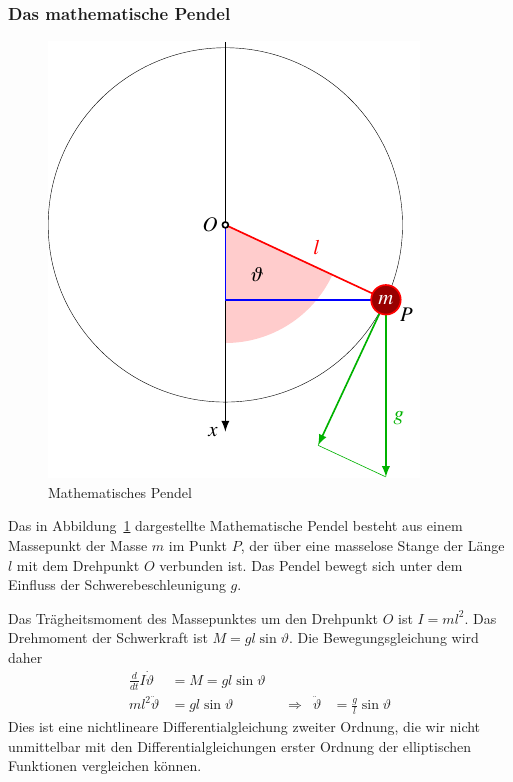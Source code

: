 \subsubsection{Das mathematische Pendel}
\begin{figure}
\centering
\includegraphics{chapters/110-elliptisch/images/pendel.pdf}
\caption{Mathematisches Pendel
\label{buch:elliptisch:fig:mathpendel}}
\end{figure}
Das in Abbildung~\ref{buch:elliptisch:fig:mathpendel} dargestellte
Mathematische Pendel besteht aus einem Massepunkt der Masse $m$
im Punkt $P$,
der über eine masselose Stange der Länge $l$ mit dem Drehpunkt $O$
verbunden ist.
Das Pendel bewegt sich unter dem Einfluss der Schwerebeschleunigung $g$.

Das Trägheitsmoment des Massepunktes um den Drehpunkt $O$ ist
\(
I=ml^2
\).
Das Drehmoment der Schwerkraft ist
\(M=gl\sin\vartheta\).
Die Bewegungsgleichung wird daher
\[
\begin{aligned}
\frac{d}{dt} I\dot{\vartheta}
&=
M
=
gl\sin\vartheta
\\
ml^2\ddot{\vartheta}
&=
gl\sin\vartheta
&&\Rightarrow&
\ddot{\vartheta}
&=\frac{g}{l}\sin\vartheta
\end{aligned}
\]
Dies ist eine nichtlineare Differentialgleichung zweiter Ordnung, die
wir nicht unmittelbar mit den Differentialgleichungen erster Ordnung
der elliptischen Funktionen vergleichen können.

